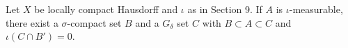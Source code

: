 Let $X$ be locally compact Hausdorff and $\iota$ as in Section 9. If $A$ is $\iota$-measurable, there exist a $\sigma$-compact set $B$ and a $G_\delta$ set $C$ with $B \subset A \subset C$ and $\iota(C \cap B') = 0$.